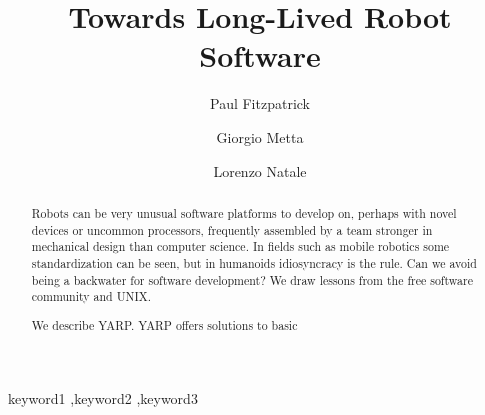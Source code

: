\begin{frontmatter}



\title{Towards Long-Lived Robot Software}


\author[at_iit]{Paul Fitzpatrick}
\author[at_iit,at_dist]{Giorgio Metta}
\author[at_iit]{Lorenzo Natale}

\address[at_iit]{IIT Address}
\address[at_dist]{DIST Address}

\begin{abstract}

Robots can be very unusual software platforms to develop on, perhaps
with novel devices or uncommon processors, frequently assembled by a
team stronger in mechanical design than computer science.  In fields
such as mobile robotics some standardization can be seen, but in
humanoids idiosyncracy is the rule.  Can we avoid being a backwater for
software development?  We draw lessons from the free software community
and UNIX.

We describe YARP.  YARP offers solutions to basic 







\end{abstract}

\begin{keyword}

keyword1 \sep keyword2 \sep keyword3


\end{keyword}

\end{frontmatter}


